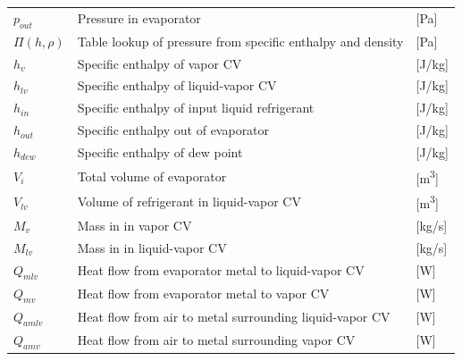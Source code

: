 \begin{center}
	\begin{tabular}{l p{10cm} l}
		$ p_{out} $      & Pressure in evaporator                                                   & [\si{Pa}]                         \\
		$\Pi(h,\rho) $   & Table lookup of pressure from specific enthalpy and density              & [\si{Pa}]                         \\
		$h_{v} $         & Specific enthalpy of vapor CV                                            & [\si{J}/\si{kg}]                  \\
		$h_{lv} $        & Specific enthalpy of liquid-vapor CV                                     & [\si{J}/\si{kg}]                  \\
		$h_{in} $        & Specific enthalpy of input liquid refrigerant                            & [\si{J}/\si{kg}]                  \\
		$h_{out}$        & Specific enthalpy out of evaporator                                      & [\si{J}/\si{kg}]                  \\
		$h_{dew}$        & Specific enthalpy of dew point                                           & [\si{J}/\si{kg}]                  \\
		$V_{i} $         & Total volume of evaporator                                               & [\si{m^3}]                        \\
		$V_{lv} $        & Volume of refrigerant in liquid-vapor CV                                 & [\si{m^3}]                        \\
		$M_{v}$          & Mass in	in vapor CV                                                      & [\si{kg}/\si{s}]                  \\
		$M_{lv}$         & Mass in	in liquid-vapor CV                                               & [\si{kg}/\si{s}]                  \\
		$Q_{mlv}$        & Heat flow from evaporator metal to liquid-vapor CV                       & [\si{W}]                          \\
		$Q_{mv}$         & Heat flow from evaporator metal to vapor CV                              & [\si{W}]                          \\
		$Q_{amlv}$       & Heat flow from air to metal surrounding liquid-vapor CV                  & [\si{W}]                          \\
		$Q_{amv}$        & Heat flow from air to metal surrounding vapor CV                         & [\si{W}]                          \\

\end{tabular}
\end{center}
